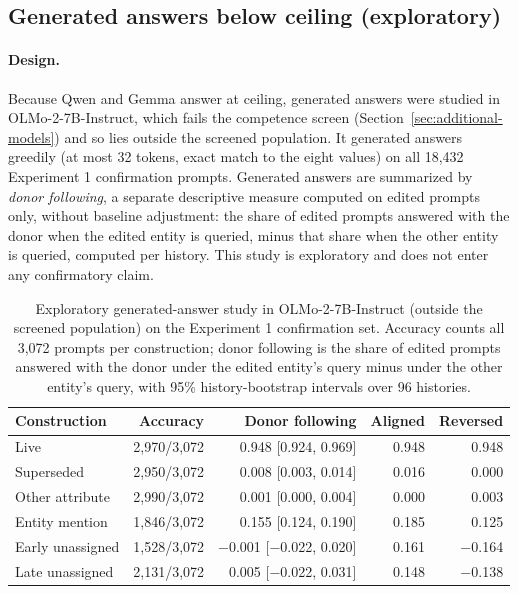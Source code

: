\subsection{Generated answers below ceiling (exploratory)}

\paragraph{Design.} Because Qwen and Gemma answer at ceiling, generated answers were studied in OLMo-2-7B-Instruct, which fails the competence screen (Section~\ref{sec:additional-models}) and so lies outside the screened population. It generated answers greedily (at most 32 tokens, exact match to the eight values) on all 18,432 Experiment 1 confirmation prompts. Generated answers are summarized by \emph{donor following}, a separate descriptive measure computed on edited prompts only, without baseline adjustment: the share of edited prompts answered with the donor when the edited entity is queried, minus that share when the other entity is queried, computed per history. This study is exploratory and does not enter any confirmatory claim.

\begin{table}[t]
\caption{Exploratory generated-answer study in OLMo-2-7B-Instruct (outside the screened population) on the Experiment 1 confirmation set. Accuracy counts all 3,072 prompts per construction; donor following is the share of edited prompts answered with the donor under the edited entity's query minus under the other entity's query, with 95\% history-bootstrap intervals over 96 histories.}
\label{tab:olmo}
\begin{center}
\small
\begin{tabular}{@{}lrrrr@{}}
\toprule
Construction & Accuracy & Donor following & Aligned & Reversed \\
\midrule
Live & 2,970/3,072 & 0.948 [0.924, 0.969] & 0.948 & 0.948 \\
Superseded & 2,950/3,072 & 0.008 [0.003, 0.014] & 0.016 & 0.000 \\
Other attribute & 2,990/3,072 & 0.001 [0.000, 0.004] & 0.000 & 0.003 \\
Entity mention & 1,846/3,072 & 0.155 [0.124, 0.190] & 0.185 & 0.125 \\
Early unassigned & 1,528/3,072 & −0.001 [−0.022, 0.020] & 0.161 & −0.164 \\
Late unassigned & 2,131/3,072 & 0.005 [−0.022, 0.031] & 0.148 & −0.138 \\
\bottomrule
\end{tabular}
\end{center}
\end{table}

